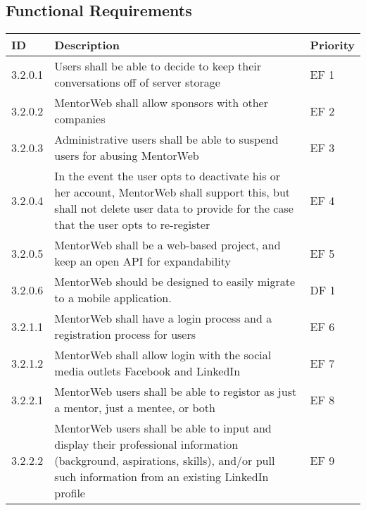 \documentclass[11pt]{article}
\begin{document}
	\subsection{Functional Requirements}
	\begin{tabular}{|l|p{8 cm}|l|}
		\hline
		ID      & Description                             & Priority \\ \hline
		3.2.0.1 & Users shall be able to decide to keep
		          their conversations\index{Conversation}
				  off of server storage                   & EF 1 \\ \hline
	    3.2.0.2 & MentorWeb shall allow
				  sponsors\index{Sponsor} with other
				  companies                               & EF 2 \\ \hline
		3.2.0.3 & Administrative users shall be able to
				  suspend users for abusing
				  MentorWeb\index{MentorWeb}              & EF 3 \\ \hline
	    3.2.0.4 & In the event the user opts to deactivate
				  his or her account,
				  MentorWeb\index{MentorWeb} shall
				  support this, but shall not delete user
				  data to provide for the case that the
				  user opts to re-register                & EF 4 \\ \hline
	    3.2.0.5 & MentorWeb\index{MentorWeb} shall be a
				  web-based project, and keep an open API
				  for expandability                       & EF 5 \\ \hline
				  3.2.0.6 & MentorWeb\index{MentorWeb}
				  should be designed to easily migrate to
				  a mobile application.                   & DF 1 \\ \hline
		3.2.1.1 & MentorWeb\index{MentorWeb} shall have a
				  login process and a registration process
				  for users                               & EF 6 \\ \hline
		3.2.1.2 & MentorWeb\index{MentorWeb} shall allow
				  login with the social media outlets
				  Facebook\index{Facebook} and
				  LinkedIn\index{LinkedIn}                & EF 7 \\ \hline
		3.2.2.1 & MentorWeb\index{MentorWeb} users shall
				  be able to registor as just a
				  mentor\index{Mentor}, just a
				  mentee\index{Mentee}, or both           & EF 8 \\ \hline
		3.2.2.2 & MentorWeb\index{MentorWeb} users shall
				  be able to input and display their
				  professional information (background,
				  aspirations, skills), and/or pull such
				  information from an existing
				  LinkedIn\index{LinkedIn} profile       & EF 9 \\ \hline
	\end{tabular}
\end{document}
